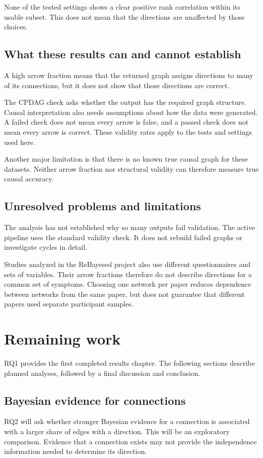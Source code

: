 \documentclass[11pt,a4paper]{article}
\begin{document}
None of the tested settings shows a clear positive rank correlation within its usable subset. This does not mean that the directions are unaffected by those choices.

\subsection{What these results can and cannot establish}
A high arrow fraction means that the returned graph assigns directions to many of its connections, but it does not show that those directions are correct.

The CPDAG check asks whether the output has the required graph structure. Causal interpretation also needs assumptions about how the data were generated. A failed check does not mean every arrow is false, and a passed check does not mean every arrow is correct. These validity rates apply to the tests and settings used here.

Another major limitation is that there is no known true causal graph for these datasets. Neither arrow fraction nor structural validity can therefore measure true causal accuracy.

\subsection{Unresolved problems and limitations}
The analysis has not established why so many outputs fail validation. The active pipeline uses the standard validity check. It does not rebuild failed graphs or investigate cycles in detail.

Studies analyzed in the ReBayesed project also use different questionnaires and sets of variables. Their arrow fractions therefore do not describe directions for a common set of symptoms. Choosing one network per paper reduces dependence between networks from the same paper, but does not guarantee that different papers used separate participant samples.

\section{Remaining work}\label{sec:outline}
RQ1 provides the first completed results chapter. The following sections describe planned analyses, followed by a final discussion and conclusion.

\subsection{Bayesian evidence for connections}
RQ2 will ask whether stronger Bayesian evidence for a connection is associated with a larger share of edges with a direction. This will be an exploratory comparison. Evidence that a connection exists may not provide the independence information needed to determine its direction.
\end{document}
